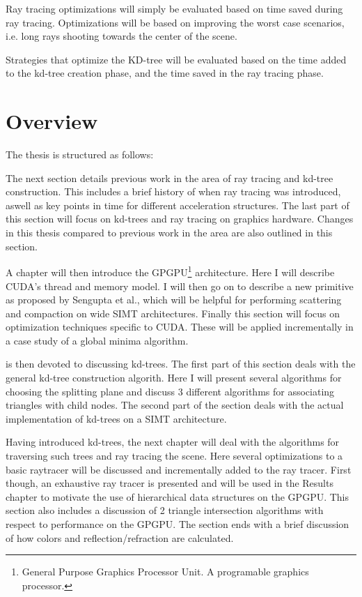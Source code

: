 
Ray tracing optimizations will simply be evaluated based on time saved
during ray tracing. Optimizations will be based on improving the
worst case scenarios, i.e. long rays shooting towards the center of
the scene.

Strategies that optimize the KD-tree will be evaluated based on the
time added to the kd-tree creation phase, and the time saved in the
ray tracing phase.

\section{Overview}

The thesis is structured as follows:


The next section details previous work in the area of ray tracing and
kd-tree construction. This includes a brief history of when ray
tracing was introduced, aswell as key points in time for different
acceleration structures. The last part of this section will focus on
kd-trees and ray tracing on graphics hardware. Changes in this thesis
compared to previous work in the area are also outlined in this
section.


A chapter will then introduce the GPGPU\footnote{General Purpose
  Graphics Processor Unit. A programable graphics processor.}
architecture. Here I will describe CUDA's thread and memory model. I
will then go on to describe a new primitive as proposed by Sengupta et
al., which will be helpful for performing
scattering and compaction on wide SIMT architectures. Finally this
section will focus on optimization techniques specific to CUDA. These
will be applied incrementally in a case study of a global minima
algorithm.


 is then devoted to discussing kd-trees. The
first part of this section deals with the general kd-tree construction
algorith. Here I will present several algorithms for choosing the
splitting plane and discuss 3 different algorithms for associating
triangles with child nodes. The second part of the section deals with
the actual implementation of kd-trees on a SIMT architecture.


Having introduced kd-trees, the next chapter will deal with the
algorithms for traversing such trees and ray tracing the scene. Here
several optimizations to a basic raytracer will be discussed and
incrementally added to the ray tracer. First though, an exhaustive ray
tracer is presented and will be used in the Results chapter to
motivate the use of hierarchical data structures on the GPGPU. This
section also includes a discussion of 2 triangle intersection
algorithms with respect to performance on the GPGPU. The section ends
with a brief discussion of how colors and reflection/refraction
are calculated.



